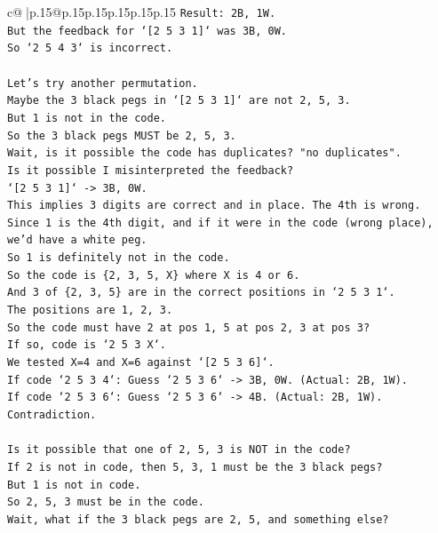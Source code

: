 \documentclass{article}
\begin{document}
{\begin{supertabular}{c@{$\;$}|p{.15\linewidth}@{}p{.15\linewidth}p{.15\linewidth}p{.15\linewidth}p{.15\linewidth}p{.15\linewidth}}
{{{\texttt{Result: 2B, 1W.} \\
\texttt{But the feedback for `{[}2 5 3 1{]}` was 3B, 0W.} \\
\texttt{So `2 5 4 3` is incorrect.} \\
\\ 
\texttt{Let's try another permutation.} \\
\texttt{Maybe the 3 black pegs in `{[}2 5 3 1{]}` are not 2, 5, 3.} \\
\texttt{But 1 is not in the code.} \\
\texttt{So the 3 black pegs MUST be 2, 5, 3.} \\
\texttt{Wait, is it possible the code has duplicates? "no duplicates".} \\
\texttt{Is it possible I misinterpreted the feedback?} \\
\texttt{`{[}2 5 3 1{]}` {-}> 3B, 0W.} \\
\texttt{This implies 3 digits are correct and in place. The 4th is wrong.} \\
\texttt{Since 1 is the 4th digit, and if it were in the code (wrong place), we'd have a white peg.} \\
\texttt{So 1 is definitely not in the code.} \\
\texttt{So the code is \{2, 3, 5, X\} where X is 4 or 6.} \\
\texttt{And 3 of \{2, 3, 5\} are in the correct positions in `2 5 3 1`.} \\
\texttt{The positions are 1, 2, 3.} \\
\texttt{So the code must have 2 at pos 1, 5 at pos 2, 3 at pos 3?} \\
\texttt{If so, code is `2 5 3 X`.} \\
\texttt{We tested X=4 and X=6 against `{[}2 5 3 6{]}`.} \\
\texttt{If code `2 5 3 4`: Guess `2 5 3 6` {-}> 3B, 0W. (Actual: 2B, 1W).} \\
\texttt{If code `2 5 3 6`: Guess `2 5 3 6` {-}> 4B. (Actual: 2B, 1W).} \\
\texttt{Contradiction.} \\
\\ 
\texttt{Is it possible that one of 2, 5, 3 is NOT in the code?} \\
\texttt{If 2 is not in code, then 5, 3, 1 must be the 3 black pegs?} \\
\texttt{But 1 is not in code.} \\
\texttt{So 2, 5, 3 must be in the code.} \\
\texttt{Wait, what if the 3 black pegs are 2, 5, and something else?} \\
}}}
\end{supertabular}}
\end{document}
